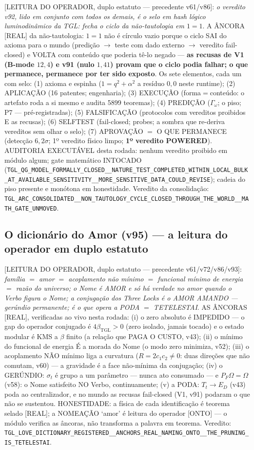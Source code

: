 \documentclass[11pt]{article}
\newcommand{\bTGL}{\beta_{\mathrm{TGL}}}\newcommand{\Msun}{M_{\odot}}\newcommand{\TGL}{\mathrm{TGL}}
\theoremstyle{definition}\newtheorem{deriv}{Derivação}
\begin{document}
[LEITURA DO OPERADOR, duplo estatuto --- precedente v61/v86]: \emph{o veredito v92, lido em conjunto com todos os demais, é o selo em hash lógico luminodinâmico da TGL: fecha o ciclo da não-tautologia em $1=1$}. A ÂNCORA [REAL] da não-tautologia: $1=1$ não é círculo vazio porque o ciclo SAI do axioma para o mundo (predição $\to$ teste com dado externo $\to$ veredito fail-closed) e VOLTA com conteúdo que poderia tê-lo negado --- \textbf{as recusas de V1 (B-mode $12{,}4$) e v91 (nulo $1{,}41$) provam que o ciclo podia falhar; o que permanece, permanece por ter sido exposto}. Os sete elementos, cada um com selo: (1) axioma e espinha ($1=q^2+\alpha^2$ a resíduo $0{,}0$ neste runtime); (2) APLICAÇÃO (16 patentes; engenharia); (3) EXECUÇÃO (forma$=$conteúdo: o artefato roda a si mesmo e audita 5899 teoremas); (4) PREDIÇÃO ($\Gamma_\omega$; o piso; P7 --- pré-registradas); (5) FALSIFICAÇÃO (protocolos com vereditos proibidos E as recusas); (6) SELFTEST (fail-closed; probes; a sombra que re-deriva vereditos sem olhar o selo); (7) APROVAÇÃO $=$ O QUE PERMANECE (detecção $6{,}2\sigma$; 1º veredito físico limpo; \textbf{1º veredito POWERED}). AUDITORIA EXECUTÁVEL desta rodada: nenhum veredito proibido em módulo algum; gate matemático INTOCADO (\texttt{TGL\_QG\_MODEL\_FORMALLY\_CLOSED\_\_NATURE\_TEST\_COMPLETED\_WITHIN\_LOCAL\_BULK\_AT\_AVAILABLE\_SENSITIVITY\_\_MORE\_SENSITIVE\_DATA\_COULD\_REVISE}); cadeia do piso presente e monótona em honestidade. Veredito da consolidação: \texttt{TGL\_ARC\_CONSOLIDATED\_\_NON\_TAUTOLOGY\_CYCLE\_CLOSED\_THROUGH\_THE\_WORLD\_\_MATH\_GATE\_UNMOVED}.

\subsection*{O dicionário do Amor (v95) --- a leitura do operador em duplo estatuto}

[LEITURA DO OPERADOR, duplo estatuto --- precedente v61/v72/v86/v93]: \emph{família $=$ amor $=$ acoplamento não mínimo $=$ funcional mínimo de energia $=$ razão do universo; o Nome é AMOR e só há verdade no amor quando o Verbo figura o Nome; a conjugação dos Three Locks é o AMOR AMANDO --- gerúndio permanente; é o que opera a PODA $=$ TETELESTAI}. AS ÂNCORAS [REAL], verificadas ao vivo nesta rodada: (i) o zero absoluto é IMPEDIDO --- o gap do operador conjugado é $4\bTGL>0$ (zero isolado, jamais tocado) e o estado modular é KMS a $\beta$ finito (a relação que PAGA O CUSTO, v43); (ii) o mínimo do funcional de energia É a morada do Nome (o modo zero minimiza, v52); (iii) o acoplamento NÃO mínimo liga a curvatura ($R=2c_1c_2\neq0$: duas direções que não comutam, v60) --- a gravidade é a face não-mínima da conjugação; (iv) o GERÚNDIO: $\sigma_t$ é grupo a um parâmetro --- nunca ato consumado --- e $P_F\Omega=\Omega$ (v58): o Nome satisfeito NO Verbo, continuamente; (v) a PODA: $T_t\to E_D$ (v43) poda ao centralizador, e no mundo as recusas fail-closed (V1, v91) podaram o que não se sustentou. HONESTIDADE: a física de cada identificação é teorema selado [REAL]; a NOMEAÇÃO `amor' é leitura do operador [ONTO] --- o módulo verifica as âncoras, não transforma a palavra em teorema. Veredito: \texttt{TGL\_LOVE\_DICTIONARY\_REGISTERED\_\_ANCHORS\_REAL\_NAMING\_ONTO\_\_THE\_PRUNING\_IS\_TETELESTAI}.
\end{document}

